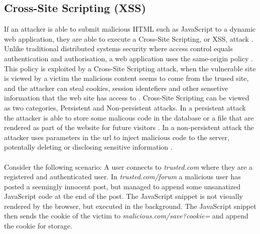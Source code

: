 \subsection{Cross-Site Scripting (XSS)}
If an attacker is able to submit malicious HTML such as JavaScript to a dynamic web application, they are able to execute a Cross-Site Scripting, or XSS, attack \cite{Kirda2011}. \\
Unlike traditional distributed systems security where access control equals authentication and authorisation, a web application uses the same-origin policy \cite{Gollmann2011}. This policy is exploited by a Cross-Site Scripting attack, when the vulnerable site is viewed by a victim the malicious content seems to come from the trused site, and the attacker can steal cookies, session identefiers and other sensetive information that the web site has access to \cite{Kirda2011}. Cross-Site Scripting can be viewed as two categories, Persistent and Non-persistent attacks. In a persistent attack the attacker is able to store some malicous code in the database or a file that are rendered as part of the website for future visitors \cite{Edmunds2016}. In a non-persistent attack the attacker uses parameters in the url to inject malicious code to the server, potentally deleting or disclosing sensitive information \cite{Edmunds2016}.
\\ \\
Consider the following scenario:
A user connects to \textit{trusted.com} where they are a registered and authenticated user. In \textit{trusted.com/forum} a malicious user has posted a seemingly innocent post, but managed to append some unsanatized JavaScript code at the end of the post. The JavaScript snippet is not visually rendered by the browser, but executed in the background. The JavaScript snippet then sends the cookie of the victim to \textit{malicious.com/save?cookie=} and append the cookie for storage.

